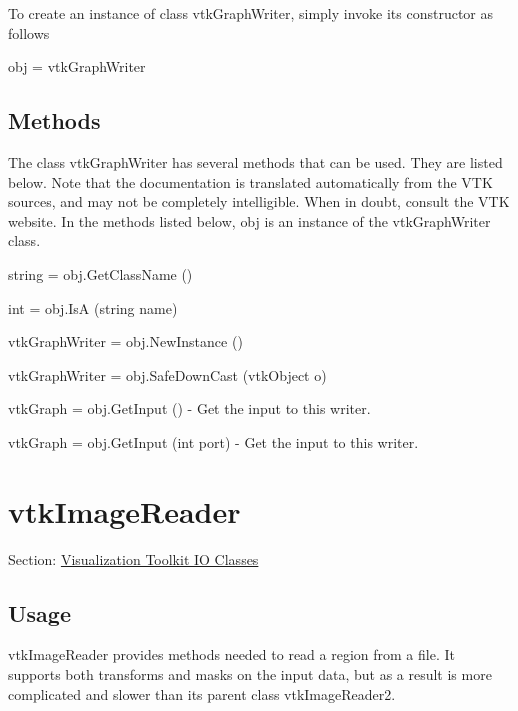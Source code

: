 To create an instance of class vtk\-Graph\-Writer, simply invoke its constructor as follows \begin{DoxyVerb}  obj = vtkGraphWriter
\end{DoxyVerb}
 \hypertarget{vtkwidgets_vtkxyplotwidget_Methods}{}\subsection{Methods}\label{vtkwidgets_vtkxyplotwidget_Methods}
The class vtk\-Graph\-Writer has several methods that can be used. They are listed below. Note that the documentation is translated automatically from the V\-T\-K sources, and may not be completely intelligible. When in doubt, consult the V\-T\-K website. In the methods listed below, {\ttfamily obj} is an instance of the vtk\-Graph\-Writer class. 
\begin{DoxyItemize}
\item {\ttfamily string = obj.\-Get\-Class\-Name ()}  
\item {\ttfamily int = obj.\-Is\-A (string name)}  
\item {\ttfamily vtk\-Graph\-Writer = obj.\-New\-Instance ()}  
\item {\ttfamily vtk\-Graph\-Writer = obj.\-Safe\-Down\-Cast (vtk\-Object o)}  
\item {\ttfamily vtk\-Graph = obj.\-Get\-Input ()} -\/ Get the input to this writer.  
\item {\ttfamily vtk\-Graph = obj.\-Get\-Input (int port)} -\/ Get the input to this writer.  
\end{DoxyItemize}\hypertarget{vtkio_vtkimagereader}{}\section{vtk\-Image\-Reader}\label{vtkio_vtkimagereader}
Section\-: \hyperlink{sec_vtkio}{Visualization Toolkit I\-O Classes} \hypertarget{vtkwidgets_vtkxyplotwidget_Usage}{}\subsection{Usage}\label{vtkwidgets_vtkxyplotwidget_Usage}
vtk\-Image\-Reader provides methods needed to read a region from a file. It supports both transforms and masks on the input data, but as a result is more complicated and slower than its parent class vtk\-Image\-Reader2.

